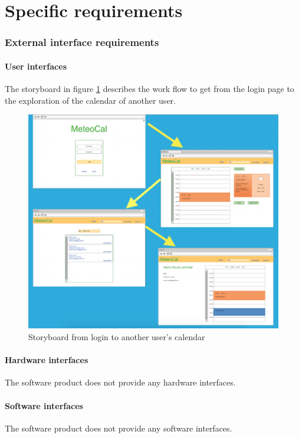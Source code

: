 \documentclass[10pt,a4paper,titlepage]{article}
\begin{document}
\clearpage
\part{Specific requirements}

\section{External interface requirements}

\subsection{User interfaces}
The storyboard in figure \ref{fig:Storyboard} describes the work flow to get from the login page to the exploration of the calendar of another user.
\begin{figure}[h!]
\centering
\includegraphics[width=\linewidth]{./UI_mockups/storyboard.png}
\caption[Storyboard]{Storyboard from login to another user's calendar}
\label{fig:Storyboard}
\end{figure}

\subsection{Hardware interfaces}
The software product does not provide any hardware interfaces.

\subsection{Software interfaces}
The software product does not provide any software interfaces.
\end{document}
